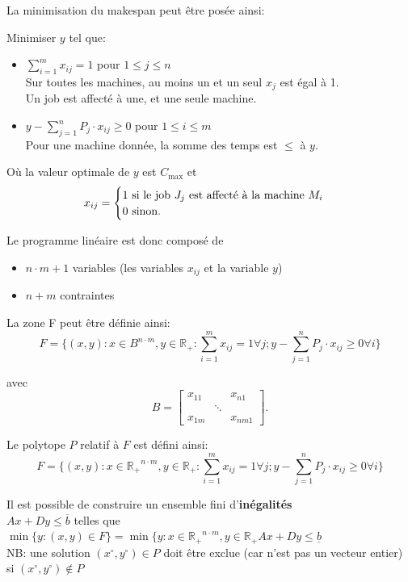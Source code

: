 \documentclass[a4paper,12pt]{report}
\theoremstyle{plain}				%
\theoremstyle{definition}				%
\newcommand{\tdi}[1]{\todo[inline]{{#1}}{}}
\newcommand{\lp}[1]{\todo[author=LP,color=yellow,inline]{#1}}
\begin{document}
\lp{définir $x_{ij}$}
\tdi{FCO: ok, fait}
\bigskip
La minimisation du makespan peut être posée ainsi:

Minimiser $y$ tel que:

\begin{itemize}
\item $\sum_{i=1}^{m}x_{ij}=1$ \quad pour $1 \leq j \leq n$ 		\\
Sur toutes les machines, au moins un et un seul $x_j$ est égal à 1.	\\
Un job est affecté à une, et une seule machine.

\item $y-\sum_{j=1}^{n}P_j \cdot x_{ij} \geq 0$ \quad pour $1 \leq i \leq m$ \\
Pour une machine donnée, la somme des temps est $\leq$ à $y$.
\end{itemize}

\bigskip
Où la valeur optimale de $y$ est $C_{\max}$
et
\[
  x_{ij} =
  \begin{cases}
    1 \textnormal{ si le job $J_j$ est affecté à la machine $M_i$}\\
    0 \textnormal{ sinon.}\\
  \end{cases}
\]

Le programme linéaire est donc composé de
\begin{itemize}
\item $n \cdot m + 1$ variables (les variables $x_{ij}$ et la variable $y$)
\item $n+m$ contraintes
\end{itemize}

La zone F peut être définie ainsi:
\[
  F=\{ (x,y) : x \in B^{n \cdot m}, y \in \mathbb{R_+} : \sum_{i=1}^{m} x_{ij}=1 \forall j;
y-\sum_{j=1}^{n} P_j \cdot x_{ij} \geq 0 \forall i \}
\]

avec
\[
B=\begin{bmatrix}
x_{11}& &x_{n1}\\
& \ddots & \\
x_{1m}& &x_{nm1}
\end{bmatrix}.
\]

Le polytope $P$ relatif à $F$ est défini ainsi:
\[
  F=\{ (x,y) : x \in \mathbb{R_+}^{n \cdot m}, y \in \mathbb{R_+} : \sum_{i=1}^{m} x_{ij}=1 \forall j;
  y-\sum_{j=1}^{n} P_j \cdot x_{ij} \geq 0 \forall i	\}
\]

Il est possible de construire un ensemble fini d'\textbf{inégalités} \\
$Ax+Dy \leq \overline{b}$ telles que \\
$\min \{y : (x,y) \in F \} = \min \{y : x \in \mathbb{R_+}^{n \cdot m}, y \in \mathbb{R_+} Ax+Dy \leq \underline{b}$ \\
NB: une solution
$(x \ensuremath{^\circ} , y\ensuremath{^\circ}) \in P$ doit être
exclue (car n'est pas un vecteur entier) si
$(x\ensuremath{^\circ}, y\ensuremath{^\circ}) \notin P $
\end{document}
